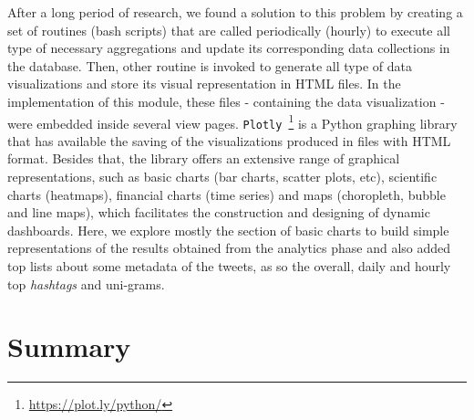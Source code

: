 After a long period of research, we found a solution to this problem by creating a set of routines (bash scripts) that are called periodically (hourly) to execute all type of necessary aggregations and update its corresponding data collections in the database. Then, other routine is invoked to generate all type of data visualizations and store its visual representation in HTML files. In the implementation of this module, these files - containing the data visualization - were embedded inside several view pages. \texttt{Plotly}~\footnote{\url{https://plot.ly/python/}} is a Python graphing library that has available the saving of the visualizations produced in files with HTML format. Besides that, the library offers an extensive range of graphical representations, such as basic charts (bar charts, scatter plots, etc), scientific charts (heatmaps), financial charts (time series) and maps (choropleth, bubble and line maps), which facilitates the construction and designing of dynamic dashboards. Here, we explore mostly the section of basic charts to build simple representations of the results obtained from the analytics phase and also added top lists about some metadata of the tweets, as so the overall, daily and hourly top \textit{hashtags} and uni-grams.

\section{Summary}
